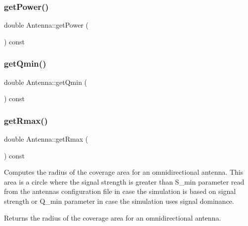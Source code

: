 \subsubsection{\texorpdfstring{get\+Power()}{getPower()}}
{\footnotesize\ttfamily double Antenna\+::get\+Power (\begin{DoxyParamCaption}{ }\end{DoxyParamCaption}) const\hspace{0.3cm}{\ttfamily [private]}}

\mbox{\label{class_antenna_a67b245a43ba9d94ba4b7d3fdace7b73c}} 
\subsubsection{\texorpdfstring{get\+Qmin()}{getQmin()}}
{\footnotesize\ttfamily double Antenna\+::get\+Qmin (\begin{DoxyParamCaption}{ }\end{DoxyParamCaption}) const\hspace{0.3cm}{\ttfamily [private]}}

\mbox{\label{class_antenna_adf33d1b0be85f95c543a31dc1b3159f5}} 
\subsubsection{\texorpdfstring{get\+Rmax()}{getRmax()}}
{\footnotesize\ttfamily double Antenna\+::get\+Rmax (\begin{DoxyParamCaption}{ }\end{DoxyParamCaption}) const}

Computes the radius of the coverage area for an omnidirectional antenna. This area is a circle where the signal strength is greater than S\+\_\+min parameter read from the antennas configuration file in case the simulation is based on signal strength or Q\+\_\+min parameter in case the simulation uses signal dominance. \begin{DoxyReturn}{Returns}
the radius of the coverage area for an omnidirectional antenna. 
\end{DoxyReturn}
\mbox{\label{class_antenna_acfaf47d35cc742e76522ea31a8b01578}} 
